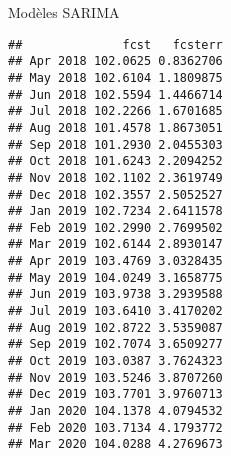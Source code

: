 \documentclass[10pt,xcolor=table,color={dvipsnames,usenames},ignorenonframetext,usepdftitle=false,french]{beamer}
\newenvironment{Shaded}{\begin{snugshade}}{\end{snugshade}}
\newcommand{\CommentTok}[1]{\textcolor[rgb]{0.56,0.35,0.01}{\textit{#1}}}
\newcommand{\NormalTok}[1]{#1}
\newcommand{\OperatorTok}[1]{\textcolor[rgb]{0.81,0.36,0.00}{\textbf{#1}}}
\begin{document}
\begin{frame}[fragile]{Modèles SARIMA}
\protect\hypertarget{moduxe8les-sarima-3}{}

\begin{Shaded}
\end{Shaded}

\begin{verbatim}
##              fcst   fcsterr
## Apr 2018 102.0625 0.8362706
## May 2018 102.6104 1.1809875
## Jun 2018 102.5594 1.4466714
## Jul 2018 102.2266 1.6701685
## Aug 2018 101.4578 1.8673051
## Sep 2018 101.2930 2.0455303
## Oct 2018 101.6243 2.2094252
## Nov 2018 102.1102 2.3619749
## Dec 2018 102.3557 2.5052527
## Jan 2019 102.7234 2.6411578
## Feb 2019 102.2990 2.7699502
## Mar 2019 102.6144 2.8930147
## Apr 2019 103.4769 3.0328435
## May 2019 104.0249 3.1658775
## Jun 2019 103.9738 3.2939588
## Jul 2019 103.6410 3.4170202
## Aug 2019 102.8722 3.5359087
## Sep 2019 102.7074 3.6509277
## Oct 2019 103.0387 3.7624323
## Nov 2019 103.5246 3.8707260
## Dec 2019 103.7701 3.9760713
## Jan 2020 104.1378 4.0794532
## Feb 2020 103.7134 4.1793772
## Mar 2020 104.0288 4.2769673
\end{verbatim}

\end{frame}
\end{document}
